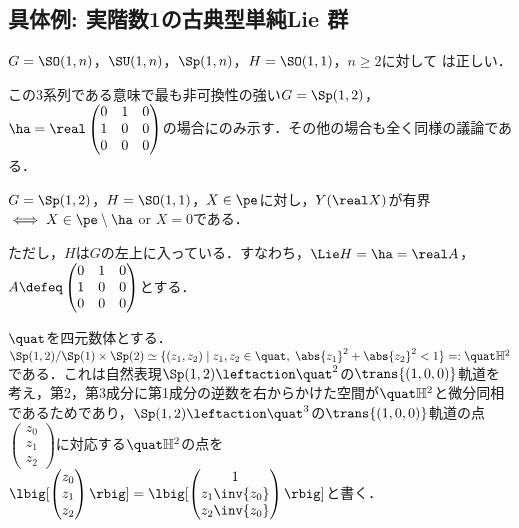 \subsection{具体例: 実階数1の古典型単純Lie 群}
\begin{prop}\label{prop:classical-rank-one}
  $G = \SO(1,n)$，$ \SU(1, n)$，$\Sp(1,n) $，$H = \SO(1,1) $，$n\geq 2$に対して は正しい．
\end{prop}

この3系列である意味で最も非可換性の強い$G = \Sp(1,2) $，$\ha = \real \begin{pmatrix}
    0 & 1 & 0 \\
    1 & 0 & 0\\
    0 & 0 & 0
  \end{pmatrix}$の場合にのみ示す．その他の場合も全く同様の議論である．
\begin{prop}\label{prop:1127-main}
  $G = \Sp(1,2) $，$H = \SO(1,1)$，$X\in \pe$に対し，$Y(\real X) $が有界$\iff X\in \pe\setminus \ha  $ or $X = 0$である．
\end{prop}

ただし，$H$は$G$の左上に入っている．すなわち，$\Lie H = \ha = \real A $，$A\defeq \begin{pmatrix}
  0 & 1 & 0 \\
  1 & 0 & 0\\
  0 & 0 & 0
\end{pmatrix}$とする．

\begin{nttdef}
  
  $\quat$を四元数体とする．$\Sp(1,2)/\Sp(1)\times \Sp(2) \simeq \{(z_1, z_2)\mid z_1,z_2\in \quat ,\; \abs{z_1}^2 + \abs{z_2}^2   < 1 \} =: \quat\mathbb{H}^2 $である．これは自然表現$\Sp(1,2)\leftaction \quat^2 $の$\trans{(1,0,0)} $軌道を考え，第2，第3成分に第1成分の逆数を右からかけた空間が$\quat\mathbb{H}^2$と微分同相であるためであり，$\Sp(1,2)\leftaction \quat^3 $の$\trans{(1,0,0)} $軌道の点$
  \begin{pmatrix}
    z_0 \\ z_1 \\ z_2 
  \end{pmatrix}
  $に対応する$\quat\mathbb{H}^2$の点を$
  \lbig[ \begin{pmatrix}
    z_0 \\ z_1 \\ z_2 
  \end{pmatrix}\rbig] = \lbig[ \begin{pmatrix}
    1 \\ z_1\inv{z_0} \\ z_2\inv{z_0} 
  \end{pmatrix}\rbig] 
  $と書く．
\end{nttdef}

